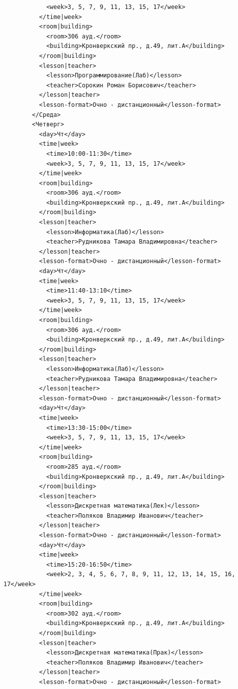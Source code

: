 \documentclass[12pt,onecolumn]{article}
\begin{document}
\begin{flushleft}
\begin{verbatim}
            <week>3, 5, 7, 9, 11, 13, 15, 17</week>
          </time|week>
          <room|building>
            <room>306 ауд.</room>
            <building>Кронверкский пр., д.49, лит.А</building>
          </room|building>
          <lesson|teacher>
            <lesson>Программирование(Лаб)</lesson>
            <teacher>Сорокин Роман Борисович</teacher>
          </lesson|teacher>
          <lesson-format>Очно - дистанционный</lesson-format>
        </Среда>
        <Четверг>
          <day>Чт</day>
          <time|week>
            <time>10:00-11:30</time>
            <week>3, 5, 7, 9, 11, 13, 15, 17</week>
          </time|week>
          <room|building>
            <room>306 ауд.</room>
            <building>Кронверкский пр., д.49, лит.А</building>
          </room|building>
          <lesson|teacher>
            <lesson>Информатика(Лаб)</lesson>
            <teacher>Рудникова Тамара Владимировна</teacher>
          </lesson|teacher>
          <lesson-format>Очно - дистанционный</lesson-format>
          <day>Чт</day>
          <time|week>
            <time>11:40-13:10</time>
            <week>3, 5, 7, 9, 11, 13, 15, 17</week>
          </time|week>
          <room|building>
            <room>306 ауд.</room>
            <building>Кронверкский пр., д.49, лит.А</building>
          </room|building>
          <lesson|teacher>
            <lesson>Информатика(Лаб)</lesson>
            <teacher>Рудникова Тамара Владимировна</teacher>
          </lesson|teacher>
          <lesson-format>Очно - дистанционный</lesson-format>
          <day>Чт</day>
          <time|week>
            <time>13:30-15:00</time>
            <week>3, 5, 7, 9, 11, 13, 15, 17</week>
          </time|week>
          <room|building>
            <room>285 ауд.</room>
            <building>Кронверкский пр., д.49, лит.А</building>
          </room|building>
          <lesson|teacher>
            <lesson>Дискретная математика(Лек)</lesson>
            <teacher>Поляков Владимир Иванович</teacher>
          </lesson|teacher>
          <lesson-format>Очно - дистанционный</lesson-format>
          <day>Чт</day>
          <time|week>
            <time>15:20-16:50</time>
            <week>2, 3, 4, 5, 6, 7, 8, 9, 11, 12, 13, 14, 15, 16, 17</week>
          </time|week>
          <room|building>
            <room>302 ауд.</room>
            <building>Кронверкский пр., д.49, лит.А</building>
          </room|building>
          <lesson|teacher>
            <lesson>Дискретная математика(Прак)</lesson>
            <teacher>Поляков Владимир Иванович</teacher>
          </lesson|teacher>
          <lesson-format>Очно - дистанционный</lesson-format>

\end{verbatim}
\end{flushleft}
\end{document}
